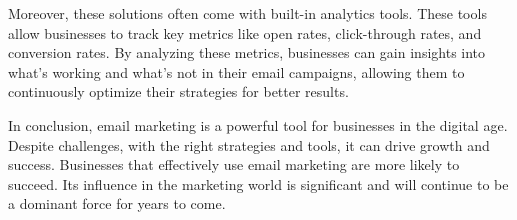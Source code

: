 \vspace{10pt}

Moreover, these solutions often come with built-in analytics tools. These tools allow businesses to track key metrics like open rates, click-through rates, and conversion rates. By analyzing these metrics, businesses can gain insights into what’s working and what’s not in their email campaigns, allowing them to continuously optimize their strategies for better results.

\vspace{10pt}

In conclusion, email marketing is a powerful tool for businesses in the digital age. Despite challenges, with the right strategies and tools, it can drive growth and success. Businesses that effectively use email marketing are more likely to succeed. Its influence in the marketing world is significant and will continue to be a dominant force for years to come.
